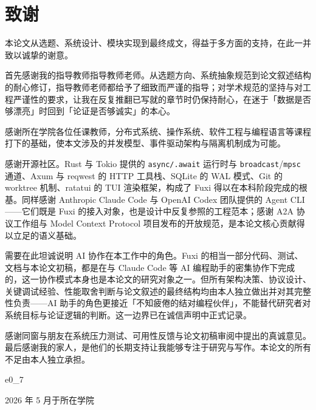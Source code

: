 
\section*{致谢}

本论文从选题、系统设计、模块实现到最终成文，得益于多方面的支持，在此一并致以诚挚的谢意。

首先感谢我的指导教师{{指导教师}}老师。从选题方向、系统抽象规范到论文叙述结构的耐心修订，{{指导教师}}老师都给予了细致而严谨的指导；对学术规范的坚持与对工程严谨性的要求，让我在反复推翻已写就的章节时仍保持耐心，在迷于「数据是否够漂亮」时回到「论证是否够诚实」的本心。

感谢{{所在学院}}各位任课教师，分布式系统、操作系统、软件工程与编程语言等课程打下的基础，使本文涉及的并发模型、事件驱动架构与隔离机制成为可能。

感谢开源社区。Rust 与 Tokio 提供的 \texttt{async/.await} 运行时与 \texttt{broadcast}/\texttt{mpsc} 通道、Axum 与 reqwest 的 HTTP 工具栈、SQLite 的 WAL 模式、Git 的 worktree 机制、ratatui 的 TUI 渲染框架，构成了 Fuxi 得以在本科阶段完成的根基。同样感谢 Anthropic Claude Code 与 OpenAI Codex 团队提供的 Agent CLI——它们既是 Fuxi 的接入对象，也是设计中反复参照的工程范本；感谢 A2A 协议工作组与 Model Context Protocol 项目发布的开放规范，是本论文核心贡献得以立足的语义基础。

需要在此坦诚说明 AI 协作在本工作中的角色。Fuxi 的相当一部分代码、测试、文档与本论文初稿，都是在与 Claude Code 等 AI 编程助手的密集协作下完成的，这一协作模式本身也是本论文的研究对象之一。但所有架构决策、协议设计、关键调试经验、性能取舍判断与论文叙述的最终结构均由本人独立做出并对其完整性负责——AI 助手的角色更接近「不知疲倦的结对编程伙伴」，不能替代研究者对系统目标与论证逻辑的判断。这一边界已在诚信声明中正式记录。

感谢同窗与朋友在系统压力测试、可用性反馈与论文初稿审阅中提出的真诚意见。最后感谢我的家人，是他们的长期支持让我能够专注于研究与写作。本论文的所有不足由本人独立承担。

\vspace{2cm}

\begin{flushright}
{ e0_7}

2026 年 5 月于{{所在学院}}
\end{flushright}
